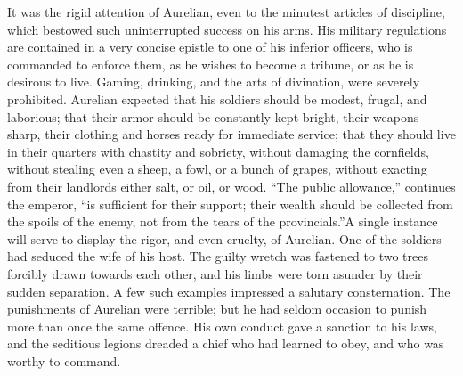 It was the rigid attention of Aurelian, even to the minutest
articles of discipline, which bestowed such uninterrupted success
on his arms. His military regulations are contained in a very
concise epistle to one of his inferior officers, who is commanded
to enforce them, as he wishes to become a tribune, or as he is
desirous to live. Gaming, drinking, and the arts of divination,
were severely prohibited. Aurelian expected that his soldiers
should be modest, frugal, and laborious; that their armor should
be constantly kept bright, their weapons sharp, their clothing
and horses ready for immediate service; that they should live in
their quarters with chastity and sobriety, without damaging the
cornfields, without stealing even a sheep, a fowl, or a bunch of
grapes, without exacting from their landlords either salt, or
oil, or wood. “The public allowance,” continues the emperor, “is
sufficient for their support; their wealth should be collected
from the spoils of the enemy, not from the tears of the
provincials.”\footnotemark[19] A single instance will serve to display the
rigor, and even cruelty, of Aurelian. One of the soldiers had
seduced the wife of his host. The guilty wretch was fastened to
two trees forcibly drawn towards each other, and his limbs were
torn asunder by their sudden separation. A few such examples
impressed a salutary consternation. The punishments of Aurelian
were terrible; but he had seldom occasion to punish more than
once the same offence. His own conduct gave a sanction to his
laws, and the seditious legions dreaded a chief who had learned
to obey, and who was worthy to command.


